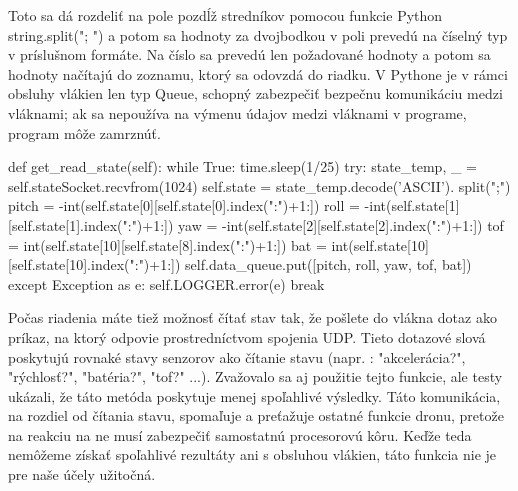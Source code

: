 {Toto sa dá rozdeliť na pole pozdĺž stredníkov pomocou funkcie Python string.split("; ") a potom sa hodnoty za dvojbodkou v poli prevedú na číselný typ v príslušnom formáte. Na číslo sa prevedú len požadované hodnoty a potom sa hodnoty načítajú do zoznamu, ktorý sa odovzdá do riadku. V Pythone je v rámci obsluhy vlákien len typ Queue, schopný zabezpečiť bezpečnu komunikáciu medzi vláknami; ak sa nepoužíva na výmenu údajov medzi vláknami v programe, program môže zamrznúť. 
\begin{mypython}[caption={Funkcia na čítanie stavov dronov },label=CL-2]
def get_read_state(self): 
    while True: 
        time.sleep(1/25) 
        try: 
            state_temp, _ = self.stateSocket.recvfrom(1024) 
            self.state = state_temp.decode('ASCII'). split(";") 
            pitch = -int(self.state[0][self.state[0].index(":")+1:]) 
            roll = -int(self.state[1][self.state[1].index(":")+1:]) 
            yaw = -int(self.state[2][self.state[2].index(":")+1:]) 
            tof = int(self.state[10][self.state[8].index(":")+1:]) 
            bat = int(self.state[10][self.state[10].index(":")+1:]) 
            self.data_queue.put([pitch, roll, yaw, tof, bat]) 
        except Exception as e: 
            self.LOGGER.error(e) 
            break
\end{mypython} 
Počas riadenia máte tiež možnosť čítať stav tak, že pošlete do vlákna dotaz ako príkaz, na ktorý odpovie prostredníctvom spojenia UDP. Tieto dotazové slová poskytujú rovnaké stavy senzorov ako čítanie stavu (napr. : "akcelerácia?", "rýchlosť?", "batéria?", "tof?" ...). Zvažovalo sa aj použitie tejto funkcie, ale testy ukázali, že táto metóda poskytuje menej spoľahlivé výsledky. Táto komunikácia, na rozdiel od čítania stavu, spomaľuje a preťažuje ostatné funkcie dronu, pretože na reakciu na ne musí zabezpečiť samostatnú procesorovú kôru. Keďže teda nemôžeme získať spoľahlivé rezultáty ani s obsluhou vlákien, táto funkcia nie je pre naše účely užitočná. 

}
